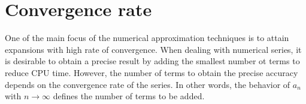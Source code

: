  

\label{numeric_series}











\newpage 
\section{Convergence rate}  \label{sec:convergence} 
One of the main focus of the numerical approximation techniques is to attain expansions with high rate of convergence. When dealing with 
numerical series, it is desirable to obtain a precise result by adding the smallest number ot terms to reduce CPU time. 
However, the number of terms to obtain the precise accuracy depends on the convergence rate of the series.
In other words, the behavior of $ a_n $ with $ n \rightarrow \infty $ defines the number of terms to be added. 




